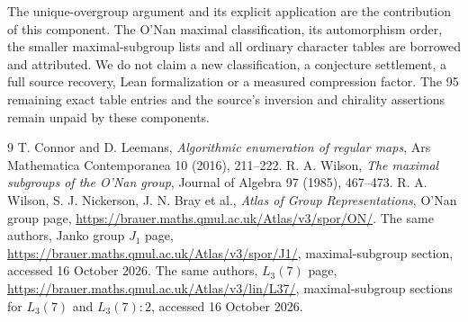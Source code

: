 \documentclass[11pt,a4paper]{article}
\begin{document}
The unique-overgroup argument and its explicit application are the
contribution of this component. The O'Nan maximal classification,
its automorphism order, the smaller maximal-subgroup lists and all
ordinary character tables are borrowed and attributed. We do not
claim a new classification, a conjecture settlement, a full source
recovery, Lean formalization or a measured compression factor.
The 95 remaining exact table entries and the source's inversion and
chirality assertions remain unpaid by these components.

\begin{thebibliography}{9}
 T. Connor and D. Leemans, \emph{Algorithmic enumeration of
regular maps}, Ars Mathematica Contemporanea 10 (2016), 211--222.
 R. A. Wilson, \emph{The maximal subgroups of the O'Nan
group}, Journal of Algebra 97 (1985), 467--473.
 R. A. Wilson, S. J. Nickerson, J. N. Bray et al.,
\emph{Atlas of Group Representations}, O'Nan group page,
\url{https://brauer.maths.qmul.ac.uk/Atlas/v3/spor/ON/}.
 The same authors, Janko group $J_1$ page,
\url{https://brauer.maths.qmul.ac.uk/Atlas/v3/spor/J1/},
maximal-subgroup section, accessed 16 October 2026.
 The same authors, $L_3(7)$ page,
\url{https://brauer.maths.qmul.ac.uk/Atlas/v3/lin/L37/},
maximal-subgroup sections for $L_3(7)$ and $L_3(7):2$,
accessed 16 October 2026.
\end{thebibliography}
\end{document}
